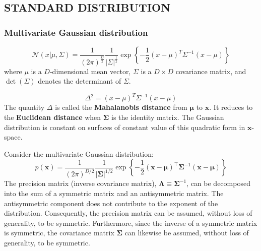 \documentclass[../main.tex]{subfiles}
\begin{document}
\subsection{STANDARD DISTRIBUTION}
\subsubsection{Multivariate Gaussian distribution}
\begin{purple}
\begin{definition}

$$
\mathcal{N}(x|\mu,\Sigma)=\frac{1}{(2\pi)^{\frac{D}{2}}}\frac{1}{|\Sigma|^{\frac{1}{2}}}\exp\left\{-\frac{1}{2}(x-\mu)^T\Sigma^{-1}(x-\mu)\right\}
$$
where $\mu$ is a $D$-dimensional mean vector, $\Sigma$ is a $D \times D$ covariance matrix, and $\det(\Sigma)$ denotes the determinant of $\Sigma$.

\end{definition}
\end{purple}

\begin{purple}
\begin{definition}
    
$$
\Delta^2=(x-\mu)^T\Sigma^{-1}(x-\mu)
$$
The quantity $\Delta$ is called the \textbf{Mahalanobis distance} from $\boldsymbol{\mu}$ to $\boldsymbol{x}$. It reduces to the \textbf{Euclidean distance} when $\boldsymbol{\Sigma}$ is the identity matrix. The Gaussian distribution is constant on surfaces of constant value of this quadratic form in $\boldsymbol{x}$-space.

\end{definition}
\end{purple}

\begin{yellow}
\begin{theorem}
Consider the multivariate Gaussian distribution:
\begin{equation*}
p(\mathbf{x}) = \frac{1}{(2\pi)^{D/2}} \frac{1}{|\boldsymbol{\Sigma}|^{1/2}} \exp \left\{ -\frac{1}{2} (\mathbf{x} - \boldsymbol{\mu})^\top \boldsymbol{\Sigma}^{-1} (\mathbf{x} - \boldsymbol{\mu}) \right\}
\end{equation*}
The precision matrix (inverse covariance matrix), $\boldsymbol{\Lambda} \equiv \boldsymbol{\Sigma}^{-1}$, can be decomposed into the sum of a symmetric matrix and an antisymmetric matrix. The antisymmetric component does not contribute to the exponent of the distribution. Consequently, the precision matrix can be assumed, without loss of generality, to be symmetric. Furthermore, since the inverse of a symmetric matrix is symmetric, the covariance matrix $\boldsymbol{\Sigma}$ can likewise be assumed, without loss of generality, to be symmetric.
\end{theorem}
\end{yellow}
\end{document}
